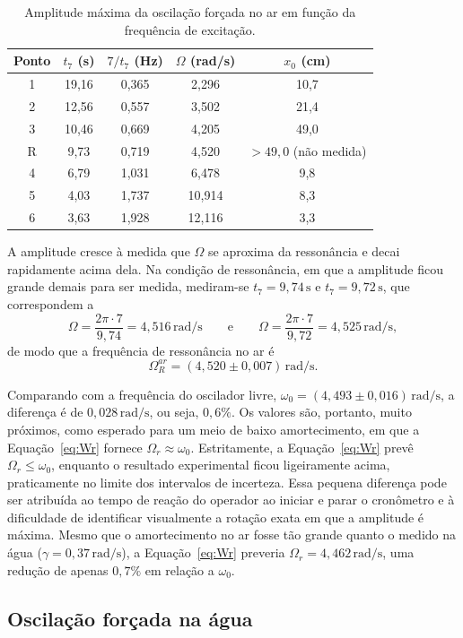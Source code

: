 \documentclass[12pt, a4paper]{article}
\newcommand{\un}[1]{\,\mathrm{#1}}
\newcommand{\fonte}[1]{\par\vspace{2pt}{\footnotesize Fonte: #1}}
\begin{document}
\begin{table}[H]
\centering
\caption{Amplitude máxima da oscilação forçada no ar em função da frequência de excitação.}
\label{tab:forcada_ar}
\begin{tabular}{ccccc}
\toprule
Ponto & $t_7$ (s) & $7/t_7$ (Hz) & $\Omega$ (rad/s) & $x_0$ (cm) \\
\midrule
1 & 19,16 & 0,365 & 2,296 & 10,7 \\
2 & 12,56 & 0,557 & 3,502 & 21,4 \\
3 & 10,46 & 0,669 & 4,205 & 49,0 \\
R & 9,73 & 0,719 & 4,520 & $>49{,}0$ (não medida) \\
4 & 6,79 & 1,031 & 6,478 & 9,8 \\
5 & 4,03 & 1,737 & 10,914 & 8,3 \\
6 & 3,63 & 1,928 & 12,116 & 3,3 \\
\bottomrule
\end{tabular}
\fonte{Elaborada pelos autores.}
\end{table}

A amplitude cresce à medida que $\Omega$ se aproxima da ressonância e decai rapidamente acima dela. Na condição de ressonância, em que a amplitude ficou grande demais para ser medida, mediram-se $t_7=9{,}74\un{s}$ e $t_7=9{,}72\un{s}$, que correspondem a
\[
\Omega=\frac{2\pi\cdot7}{9{,}74}=4{,}516\un{rad/s}
\qquad\text{e}\qquad
\Omega=\frac{2\pi\cdot7}{9{,}72}=4{,}525\un{rad/s},
\]
de modo que a frequência de ressonância no ar é
\[
\Omega_R^{ar}=(4{,}520\pm0{,}007)\un{rad/s}.
\]

Comparando com a frequência do oscilador livre, $\omega_0=(4{,}493\pm0{,}016)\un{rad/s}$, a diferença é de $0{,}028\un{rad/s}$, ou seja, $0{,}6\%$. Os valores são, portanto, muito próximos, como esperado para um meio de baixo amortecimento, em que a Equação~\eqref{eq:Wr} fornece $\Omega_r\approx\omega_0$. Estritamente, a Equação~\eqref{eq:Wr} prevê $\Omega_r\le\omega_0$, enquanto o resultado experimental ficou ligeiramente acima, praticamente no limite dos intervalos de incerteza. Essa pequena diferença pode ser atribuída ao tempo de reação do operador ao iniciar e parar o cronômetro e à dificuldade de identificar visualmente a rotação exata em que a amplitude é máxima. Mesmo que o amortecimento no ar fosse tão grande quanto o medido na água ($\gamma=0{,}37\un{rad/s}$), a Equação~\eqref{eq:Wr} preveria $\Omega_r=4{,}462\un{rad/s}$, uma redução de apenas $0{,}7\%$ em relação a $\omega_0$.

\subsection{Oscilação forçada na água}
\end{document}
